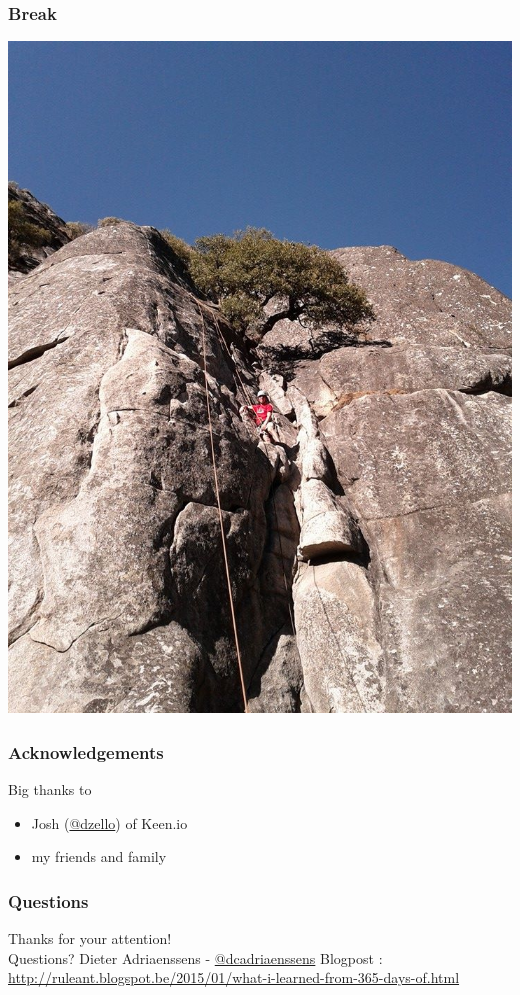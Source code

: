 \documentclass[14pt]{beamer}
\begin{document}
  \begin{frame}
    \frametitle{Break}
    \includegraphics[scale=.25]{climbing.jpg}
  \end{frame}
  \begin{frame}
    \frametitle{Acknowledgements}
    Big thanks to
    \begin{itemize}
      \item Josh (\href{https://twitter.com/dzello}{@dzello}) of Keen.io
      \item my friends and family
    \end{itemize}
  \end{frame}
  \begin{frame}
   \frametitle{Questions}
    Thanks for your attention!\\
    Questions?
    \vfill
    Dieter Adriaenssens - \href{https://twitter.com/dcadriaenssens}{\small{@dcadriaenssens}}
    \vfill
    Blogpost : \href{http://ruleant.blogspot.be/2015/01/what-i-learned-from-365-days-of.html}{http://ruleant.blogspot.be/2015/01/what-i-learned-from-365-days-of.html}
  \end{frame}
\end{document}
